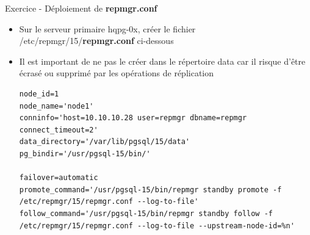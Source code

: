 
\begin{frame}[fragile]{Exercice - Déploiement de \textbf{repmgr.conf}}

   \begin{itemize}
      \item Sur le serveur primaire hqpg-0x, créer le fichier /etc/repmgr/15/\textbf{repmgr.conf} ci-dessous
      \item Il est important de ne pas le créer dans le répertoire data car il risque d'être écrasé ou supprimé par les opérations de réplication
\begin{tiny}
\begin{Verbatim}[commandchars=\\\{\}]
node_id=1
node_name='node1'
conninfo='host=10.10.10.28 user=repmgr dbname=repmgr connect_timeout=2'
data_directory='/var/lib/pgsql/15/data'
pg_bindir='/usr/pgsql-15/bin/'

failover=automatic
promote_command='/usr/pgsql-15/bin/repmgr standby promote -f /etc/repmgr/15/repmgr.conf --log-to-file'
follow_command='/usr/pgsql-15/bin/repmgr standby follow -f /etc/repmgr/15/repmgr.conf --log-to-file --upstream-node-id=%n'
\end{Verbatim}
\end{tiny}
   \end{itemize}

\begin{toile}
\end{toile}

\end{frame}


